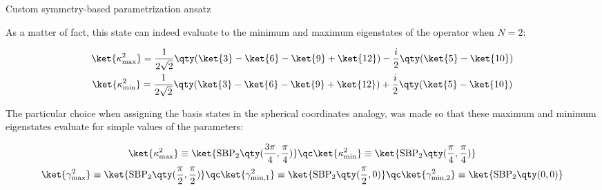 \begin{frame}[allowframebreaks]{Custom symmetry-based parametrization ansatz}
\break

	As a matter of fact, this state can indeed evaluate to the minimum and maximum eigenstates of the operator when $N=2$:

	\begin{gather*}
	  \ket{\kappa_{\text{max}}^{2}} =
	    \frac{1}{2\sqrt{2}} \qty(\ket{3}-\ket{6}-\ket{9}+\ket{12}) -
	    \frac{i}{2} \qty(\ket{5}-\ket{10}) \\
	  \ket{\kappa_{\text{min}}^{2}} =
	  \frac{1}{2\sqrt{2}} \qty(\ket{3}-\ket{6}-\ket{9}+\ket{12}) +
	  \frac{i}{2} \qty(\ket{5}-\ket{10})
	\end{gather*}

	The particular choice when assigning the basis states in the spherical coordinates analogy, was made so that these maximum and minimum eigenstates evaluate for simple values of the parameters:

	\begin{gather*}
	  \ket{\kappa_{\text{max}}^{2}} \equiv
	    \ket{\text{SBP}_{2} \qty(\frac{3\pi}{4}, \frac{\pi}{4})} \qc
	  \ket{\kappa_{\text{min}}^{2}} \equiv
	    \ket{\text{SBP}_{2} \qty(\frac{\pi}{4}, \frac{\pi}{4})} \\
	  \ket{\gamma_{\text{max}}^{2}} \equiv
	    \ket{\text{SBP}_{2} \qty(\frac{\pi}{2}, \frac{\pi}{2})} \qc
	  \ket{\gamma_{\text{min},1}^{2}} \equiv
	    \ket{\text{SBP}_{2} \qty(\frac{\pi}{2}, 0)} \qc
	  \ket{\gamma_{\text{min},2}^{2}} \equiv
	    \ket{\text{SBP}_{2} \qty(0, 0)}
	\end{gather*}

\end{frame}


